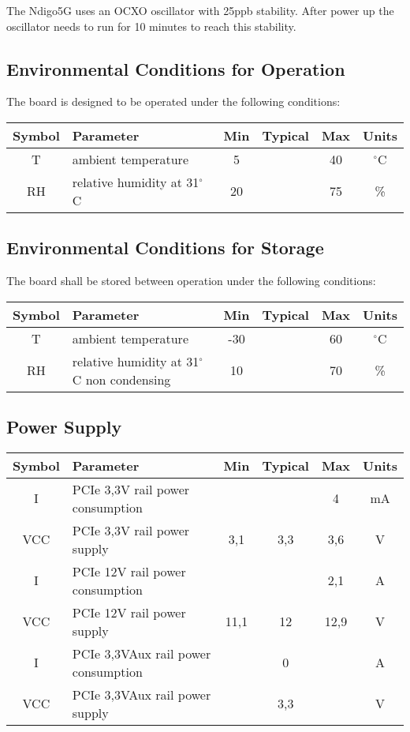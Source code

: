 		The Ndigo5G uses an OCXO oscillator with 25ppb stability. After power up the oscillator needs to run for 10 minutes to reach this stability.
		
	\subsection{Environmental Conditions for Operation}
		\label{enviro_op}
		The board is designed to be operated under the following conditions:
		
		\noindent
		\begin{tabularx}{\textwidth}{|c|X|c|c|c|c|}
			\hline
			Symbol & Parameter & Min & Typical & Max & Units\\
			\hline\hline
			T & ambient temperature & 5 && 40 & $^{\circ}$C\\
			\hline
			RH & relative humidity at 31$^{\circ}$C & 20 && 75 & \%\\
			\hline
		\end{tabularx}
		
	\subsection{Environmental Conditions for Storage}
		\label{enviro_store}
		The board shall be stored between operation under the following conditions:
		
		\noindent
		\begin{tabularx}{\textwidth}{|c|X|c|c|c|c|}
			\hline
			Symbol & Parameter & Min & Typical & Max & Units\\
			\hline\hline
			T & ambient temperature & -30 && 60 & $^{\circ}$C\\
			\hline
			RH & relative humidity at 31$^{\circ}$C non condensing & 10 && 70 & \%\\
			\hline
		\end{tabularx}
		
	\subsection{Power Supply}
		
		\noindent
		\begin{tabularx}{\textwidth}{|c|X|c|c|c|c|}
			\hline
			Symbol & Parameter & Min & Typical & Max & Units\\
			\hline\hline
			I & PCIe 3,3V rail power consumption &&&4& mA\\
			\hline
			VCC & PCIe 3,3V rail power supply &3,1&3,3&3,6& V\\
			\hline
			I & PCIe 12V rail power consumption &&&2,1& A\\
			\hline
			VCC & PCIe 12V rail power supply &11,1&12&12,9& V\\
			\hline
			I & PCIe 3,3VAux rail power consumption &&0&& A\\
			\hline
			VCC & PCIe 3,3VAux rail power supply &&3,3&& V\\
			\hline
		\end{tabularx}
		
